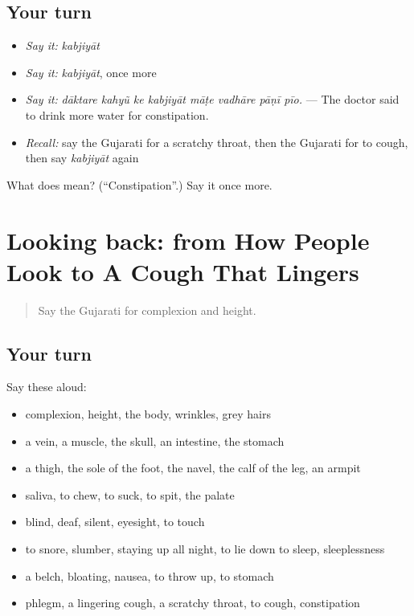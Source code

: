\subsection*{Your turn}
\begin{itemize}
\raggedright
  \item \emph{Say it:} \emph{kabjiyāt}
  \item \emph{Say it:} \emph{kabjiyāt}, once more
  \item \emph{Say it:} \emph{dāktare kahyũ ke kabjiyāt māṭe vadhāre pāṇī pīo.} — The doctor said to drink more water for constipation.
  \item \emph{Recall:} say the Gujarati for a scratchy throat, then the Gujarati for to cough, then say \emph{kabjiyāt} again
\end{itemize}

\begin{tcolorbox}[breakable,colback=teal!4,colframe=teal!35!black,title={Before you move on}]
What does  mean? (\textquotedblleft{}Constipation\textquotedblright{}.) Say it once more.
\end{tcolorbox}
\section[(dialogue)]{Looking back: from How People Look to A Cough That Lingers}

\label{lesson:GU-R478-review-471-478}



\begin{quote}
Say the Gujarati for complexion and height.
\end{quote}

\subsection*{Your turn}
Say these aloud:

\begin{itemize}
\raggedright
  \item complexion, height, the body, wrinkles, grey hairs
  \item a vein, a muscle, the skull, an intestine, the stomach
  \item a thigh, the sole of the foot, the navel, the calf of the leg, an armpit
  \item saliva, to chew, to suck, to spit, the palate
  \item blind, deaf, silent, eyesight, to touch
  \item to snore, slumber, staying up all night, to lie down to sleep, sleeplessness
  \item a belch, bloating, nausea, to throw up, to stomach
  \item phlegm, a lingering cough, a scratchy throat, to cough, constipation
\end{itemize}

